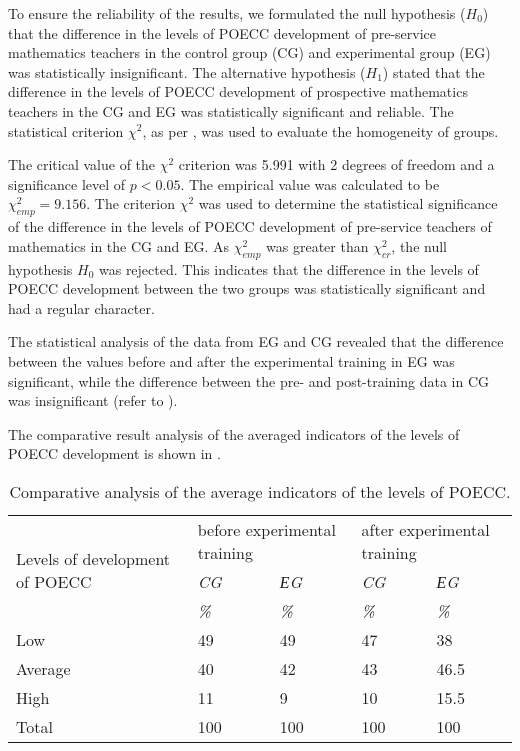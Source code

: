 To ensure the reliability of the results, we formulated the null
hypothesis ($H_0$) that the difference in the
levels of POECC development of pre-service mathematics teachers in the
control group (CG) and experimental group (EG) was statistically
insignificant. The alternative hypothesis
($H_1$) stated that the difference in the
levels of POECC development of prospective mathematics teachers in the
CG and EG was statistically significant and reliable. The statistical
criterion $\chi^2$, as per , was used to evaluate the homogeneity of
groups.



The critical value of the $\chi^{2}$ criterion was 5.991 with 2 degrees of freedom
and a significance level of $p < 0.05$. The empirical
value was calculated to be $\chi^2_{emp} = 9.156$. The criterion $\chi^{2}$ was used to determine
the statistical significance of the difference in the levels of POECC
development of pre-service teachers of mathematics in the CG and EG. As $\chi^2_{emp}$
was greater than $\chi^2_{cr}$, the null hypothesis $H_0$ was
rejected. This indicates that the difference in the levels of POECC
development between the two groups was statistically significant and had
a regular character.



The statistical analysis of the data from EG and CG revealed that the
difference between the values before and after the experimental training
in EG was significant, while the difference between the pre- and
post-training data in CG was insignificant (refer to ).
	
The comparative result analysis of the averaged indicators of the levels of POECC development is shown in .
	
\begin{table}[htpb]
\centering
\begin{threeparttable}
\caption{Comparative analysis of the average indicators of the levels of POECC.}
\label{tab-05}
\begin{tabular}{l l l l l}
\toprule
\multicolumn{1}{p{3cm}}{\multirow{3}{=}{Levels of development of POECC}} & \multicolumn{2}{p{3cm}}{before experimental training} & \multicolumn{2}{p{3cm}}{after experimental training} \\
& \emph{CG} & \emph{ЕG} & \emph{CG} & \emph{ЕG}  \\
& \emph{\%} & \emph{\%} & \emph{\%} & \emph{\%}  \\
\midrule
Low & 49 & 49 & 47 & 38 \\
Average & 40 & 42 & 43 & 46.5 \\
High & 11 & 9 & 10 & 15.5 \\
Total & 100 & 100 & 100 & 100 \\
\bottomrule
\end{tabular}
\end{threeparttable}
\end{table}
	
